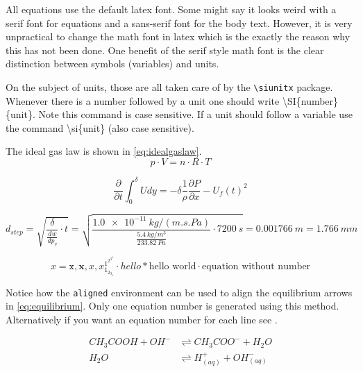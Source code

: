 All equations use the default latex font. Some might say it looks weird with a serif font for equations and a sans-serif font for the body text. However, it is very unpractical to change the math font in latex which is the exactly the reason why this has not been done. One benefit of the serif style math font is the clear distinction between symbols (variables) and units. 

On the subject of units, those are all taken care of by the \texttt{\textbackslash siunitx} package. Whenever there is a number followed by a unit one should write \textbackslash SI\{number\}\{unit\}. Note this command is case sensitive. If a unit should follow a variable use the command \textbackslash si\{unit\} (also case sensitive). 

The ideal gas law is shown in \cref{eq:idealgaslaw}.
\begin{equation} \label{eq:idealgaslaw}
    p \cdot V = n \cdot R \cdot T
\end{equation}

\begin{equation} \label{eq:IME}
    \frac{\partial}{\partial t} \int_{0}^{\delta} U dy = - \delta \frac{1}{\rho}\frac{\partial P}{\partial x}-U_f(t)^2
\end{equation}

\begin{equation} \label{eq:penDepthStep}
d_{step} = \sqrt{\frac{\delta}{\frac{dw}{dp_v}} \cdot t} = 
\sqrt{\frac{\SI{1.0e-11}{kg/(m.s.Pa)}}{\frac{\SI{5.4}{kg/m^3}}{\SI{233.82}{Pa}}} \cdot \SI{7200}{s}} = 
\SI{0.001766}{m} = \SI{1.766}{mm}
\end{equation}

\begin{equation*} %
    x = \mathtt{x}, \mathbf{x}, \mathit{x}, x_{1_{2_{3_{4}}}}^{1^{2^{3^{4}}}} \cdot hello * \text{hello world} \cdot \text{equation without number}
\end{equation*}

Notice how the \texttt{aligned} environment can be used to align the equilibrium arrows in \cref{eq:equilibrium}. Only one equation number is generated using this method. Alternatively if you want an equation number for each line see .

\begin{equation} \label{eq:equilibrium}
\begin{aligned} 
    CH_3COOH + OH^{-} &\rightleftharpoons CH_3COO^{-} + H_2O \\
    H_2O &\rightleftharpoons H^{+}_{(aq)} + OH^{-}_{(aq)}
\end{aligned}
\end{equation}


